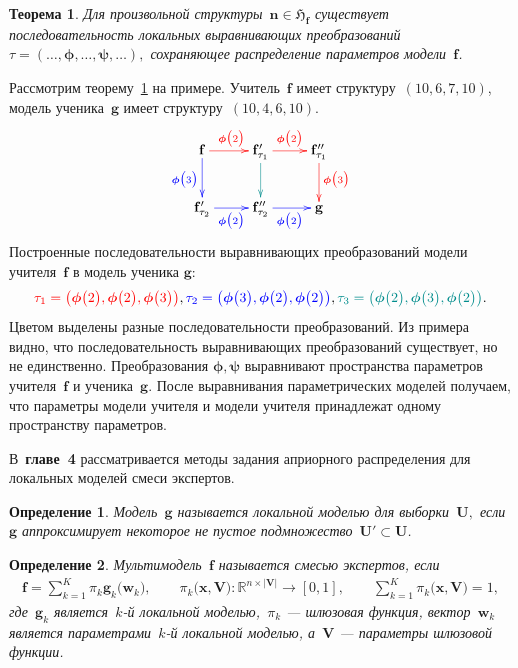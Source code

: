 \documentclass{dissert}
\newtheorem{theorem}{Теорема}
\newtheorem{definition}{Определение}
\begin{document}
\begin{theorem}
\label{th-9:visual}
Для произвольной структуры~$\mathbf{n} \in \mathfrak{H}_{\mathbf{f}}$ существует последовательность локальных выравнивающих преобразований $\tau = (\ldots, \bm{\phi}, \ldots, \bm{\psi}, \ldots),$ сохраняющее распределение параметров модели~$\mathbf{f}$.
\end{theorem}

Рассмотрим теорему~\ref{th-9:visual} на примере. Учитель~$\mathbf{f}$ имеет структуру~$(10, 6, 7, 10)$, модель ученика~$\mathbf{g}$ имеет структуру~$(10,4,6,10)$.
\[
\xymatrix{
\mathbf{f}\ar@[blue][d]_{\color{blue}\bm{\phi}\bigr(3\bigr)}\ar@[red][r]^{\color{red}\bm{\phi}\bigr(2\bigr)}
& 
\mathbf{f}_{\tau_1}'\ar@[darkcyan][d]\ar@[red][r]^{\color{red}\bm{\phi}\bigr(2\bigr)}
&
\mathbf{f}_{\tau_1}''\ar@[red][d]^{\color{red}\bm{\phi}\bigr(3\bigr)}
\\
\mathbf{f}_{\tau_2}'\ar@[blue][r]_{\color{blue}\bm{\phi}\bigr(2\bigr)}
& 
\mathbf{f}_{\tau_2}''\ar@[blue][r]_{\color{blue}\bm{\phi}\bigr(2\bigr)}
&
\mathbf{g}
}
\]
Построенные последовательности выравнивающих преобразований модели учителя~$\mathbf{f}$ в модель ученика $\mathbf{g}$:
\[
{\color{red}\tau_1=\left(\bm{\phi}\bigr(2\bigr), \bm{\phi}\bigr(2\bigr), \bm{\phi}\bigr(3\bigr)\right)}, {\color{blue}\tau_2=\left(\bm{\phi}\bigr(3\bigr), \bm{\phi}\bigr(2\bigr), \bm{\phi}\bigr(2\bigr)\right)}, {\color{darkcyan}\tau_3=\left(\bm{\phi}\bigr(2\bigr), \bm{\phi}\bigr(3\bigr), \bm{\phi}\bigr(2\bigr)\right)}.
\]
Цветом выделены разные последовательности преобразований.
Из примера видно, что последовательность выравнивающих преобразований существует, но не единственно. Преобразования $\bm{\phi}, \bm{\psi}$ выравнивают пространства параметров учителя~$\mathbf{f}$ и ученика~$\mathbf{g}$. После выравнивания параметрических моделей получаем, что параметры модели учителя и модели учителя принадлежат одному пространству параметров.

В~\textbf{главе~4} рассматривается методы задания априорного распределения для локальных моделей смеси экспертов.

\begin{definition}
\label{def:1}
Модель~$\mathbf{g}$ называется локальной моделью для выборки~$\textbf{U},$ если~$\mathbf{g}$ аппроксимирует некоторое не пустое подмножество~$\textbf{U}'\subset\textbf{U}$.
\end{definition}

\begin{definition}
\label{def:2}
Мультимодель~$\mathbf{f}$ называется смесью экспертов, если
\[
\label{ch4-eq:st:2}
\begin{aligned}
\mathbf{f} = \sum_{k=1}^{K}\pi_{k}\mathbf{g}_k\bigr(\mathbf{w}_k\bigr), \qquad \pi_{k}\bigr(\mathbf{x}, \mathbf{V}\bigr):\mathbb{R}^{n\times \left|\mathbf{V}\right|} \to [0, 1], \qquad \sum_{k=1}^{K}\pi_{k}\bigr(\mathbf{x}, \mathbf{V}\bigr) = 1,
\end{aligned}
\]
где~$\mathbf{g}_k$ является~$k$-й локальной моделью,~$\pi_k$ --- шлюзовая функция, вектор~$\mathbf{w}_k$ является параметрами~$k$-й локальной моделью, а~$\mathbf{V}$ --- параметры шлюзовой функции.
\end{definition}
\end{document}
